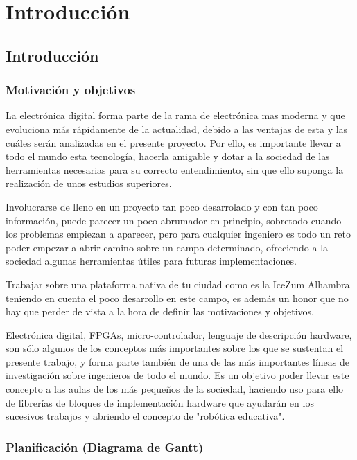 \chapter{Introducción}\label{sec:intro}

\section{Introducción}

\subsection{Motivación y objetivos}
La electrónica digital forma parte de la rama de electrónica mas moderna y que evoluciona más rápidamente de la actualidad, debido a las ventajas de esta y las cuáles serán analizadas en el presente proyecto. Por ello, es importante llevar a todo el mundo esta tecnología, hacerla amigable y dotar a la sociedad de las herramientas necesarias para su correcto entendimiento, sin que ello suponga la realización de unos estudios superiores. \newline

Involucrarse de lleno en un proyecto tan poco desarrolado y con tan poco información, puede parecer un poco abrumador en principio, sobretodo cuando los problemas empiezan a aparecer, pero para cualquier ingeniero es todo un reto poder empezar a abrir camino sobre un campo determinado, ofreciendo a la sociedad algunas herramientas útiles para futuras implementaciones. \newline

Trabajar sobre una plataforma nativa de tu ciudad como es la IceZum Alhambra teniendo en cuenta el poco desarrollo en este campo, es además un honor que no hay que perder de vista a la hora de definir las motivaciones y objetivos. \newline

Electrónica digital, FPGAs, micro-controlador, lenguaje de descripción hardware, son sólo algunos de los conceptos más importantes sobre los que se sustentan el presente trabajo, y forma parte también de una de las más importantes líneas de investigación sobre ingenieros de todo el mundo. Es un objetivo poder llevar este concepto a las aulas de los más pequeños de la sociedad, haciendo uso para ello de librerías de bloques de implementación hardware que ayudarán en los sucesivos trabajos y abriendo el concepto de "robótica educativa".

\subsection{Planificación (Diagrama de Gantt)}


